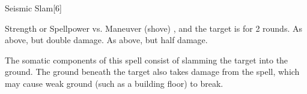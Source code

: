 \begin{spellsection}{Seismic Slam}[6]
    \begin{spellheader}
    \end{spellheader}
    \begin{spellcontent}
        \begin{spelltargetinginfo}
        \end{spelltargetinginfo}
        \begin{spelleffects}
            \begin{spellattack}{Strength or Spellpower vs. Maneuver (shove)}
                \spellsuccess {}, and the target is \immobilized for 2 rounds.
                \spellcritical As above, but double damage.
                \spellfailure As above, but half damage.
            \end{spellattack}
        \end{spelleffects}
    \end{spellcontent}
    \begin{spellfooter}
        \spellnotes The somatic components of this spell consist of slamming the target into the ground. The ground beneath the target also takes damage from the spell, which may cause weak ground (such as a building floor) to break.
        \miscastexplode
    \end{spellfooter}
\end{spellsection}

